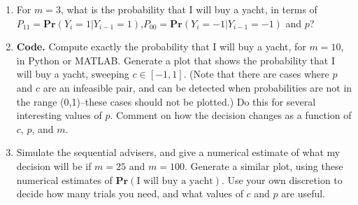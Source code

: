 \documentclass{article}
\newcommand{\pr}{\mathbf{Pr}}
\begin{document}
\begin{enumerate}
\begin{enumerate}
\item For $m = 3$, what is the probability that I will buy a yacht, in terms of $P_{11} = \pr(Y_i=1|Y_{i-1}=1)$,$P_{00} = \pr(Y_i=-1|Y_{i-1}=-1)$ and $p$?



\item 
\textbf{Code.}  Compute exactly the probability that I will buy a yacht, for $m = 10$, in Python or MATLAB. 
Generate a plot that shows the probability that I will buy a yacht, sweeping $c\in [-1,1]$. (Note that there are cases where $p$ and $c$ are an infeasible pair, and can be detected when probabilities are not in the range (0,1)--these cases should not be plotted.) Do this for several interesting values of $p$.
Comment on how the decision changes as a function of $c$, $p$, and $m$.



\item Simulate the sequential advisers, and give a numerical estimate of what my decision will be if $m = 25$ and $m = 100$. Generate a similar plot, using these numerical estimates of $\pr(\text{I will buy a yacht})$. Use your own discretion to decide how many trials you need, and what values of $c$ and $p$ are useful.



\end{enumerate}


\end{enumerate}
\end{document}
